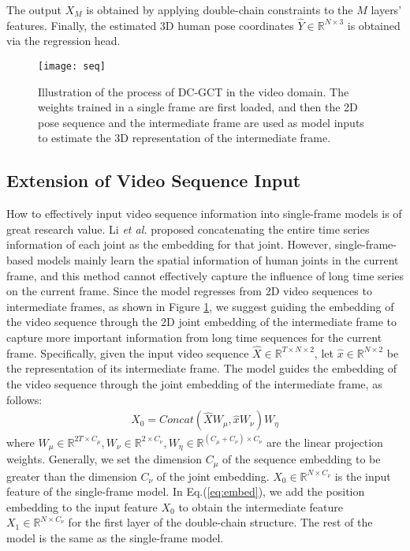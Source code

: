 \documentclass[journal]{IEEEtran}
\begin{document}
The output $X_M$ is obtained by applying double-chain constraints to the $M$ layers' features. Finally, the estimated 3D human pose coordinates $\widehat{Y} \in \mathbb{R}^{N \times 3}$ is obtained via the regression head.


\begin{figure}[t]
  \centering
  \texttt{[image: seq]}
  \caption{Illustration of the process of DC-GCT in the video domain. The weights trained in a single frame are first loaded, and then the 2D pose sequence and the intermediate frame are used as model inputs to estimate the 3D representation of the intermediate frame.}
\label{fig:seq}
\end{figure}

\subsection{Extension of Video Sequence Input}

How to effectively input video sequence information into single-frame models is of great research value. Li \textit{et al.} \cite{li2022graphmlp} proposed concatenating the entire time series information of each joint as the embedding for that joint. However, single-frame-based models mainly learn the spatial information of human joints in the current frame, and this method cannot effectively capture the influence of long time series on the current frame. Since the model regresses from 2D video sequences to intermediate frames, as shown in Figure \ref{fig:seq}, we suggest guiding the embedding of the video sequence through the 2D joint embedding of the intermediate frame to capture more important information from long time sequences for the current frame. Specifically, given the input video sequence $\hat{X}\in \mathbb{R}^{T \times N \times 2}$, let $\hat{x}\in \mathbb{R}^{N \times 2}$ be the representation of its intermediate frame. The model guides the embedding of the video sequence through the joint embedding of the intermediate frame, as follows:
\begin{gather}
  \label{eq:guide}
  X_0 = Concat(\hat{X} W_{\mu},\hat{x}W_{\nu})W_{\eta}
\end{gather}
where $W_{\mu}\in \mathbb{R}^{2T \times C_\mu},W_{\nu}\in \mathbb{R}^{2 \times C_\nu},W_{\eta} \in \mathbb{R}^{(C_\mu +C_\nu) \times C_\nu}$ are the linear projection weights. Generally, we set the dimension $C_\mu$ of the sequence embedding to be greater than the dimension $C_\nu$ of the joint embedding. $X_0 \in \mathbb{R}^{N \times C_\nu}$ is the input feature of the single-frame model. In Eq.(\ref{eq:embed}), we add the position embedding to the input feature $X_0$ to obtain the intermediate feature $X_1 \in \mathbb{R}^{N \times C_\nu}$ for the first layer of the double-chain structure. The rest of the model is the same as the single-frame model.
\end{document}
